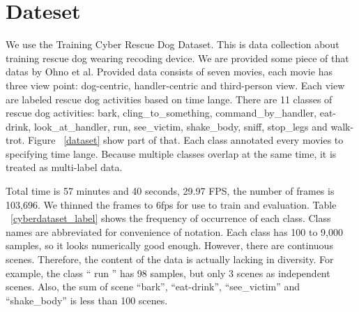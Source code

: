 \documentclass[MIRU,submit,english]{miru2019e}
\begin{document}
\section{Dateset}
We use the Training Cyber Rescue Dog Dataset.
This is data collection about training rescue dog wearing recoding device. We are provided some piece of that datas by Ohno et al.
Provided data consists of seven movies, each movie has three view point: dog-centric, handler-centric and third-person view.
Each view are labeled rescue dog activities based on time lange.
There are 11 classes of rescue dog activities: bark, cling\_to\_something, command\_by\_handler, eat-drink, look\_at\_handler, run, see\_victim, shake\_body, sniff, stop\_legs and walk-trot.
Figure ~\ref{dataset} show part of that.
Each class annotated every movies to specifying time lange. Because multiple classes overlap at the same time, it is treated as multi-label data.

Total time is 57 minutes and 40 seconds, 29.97 FPS, the number of frames is 103,696.
We thinned the frames to 6fps for use to train and evaluation. 
Table ~\ref{cyberdataset_label} shows the frequency of occurrence of each class. Class names are abbreviated for convenience of notation.
Each class has 100 to 9,000 samples, so it looks numerically good enough.
However, there are continuous scenes. Therefore, the content of the data is actually lacking in diversity.
For example, the class `` run '' has 98 samples, but only 3 scenes as independent scenes.
Also, the sum of scene ``bark'', ``eat-drink'', ``see\_victim'' and ``shake\_body'' is less than 100 scenes.
\end{document}
